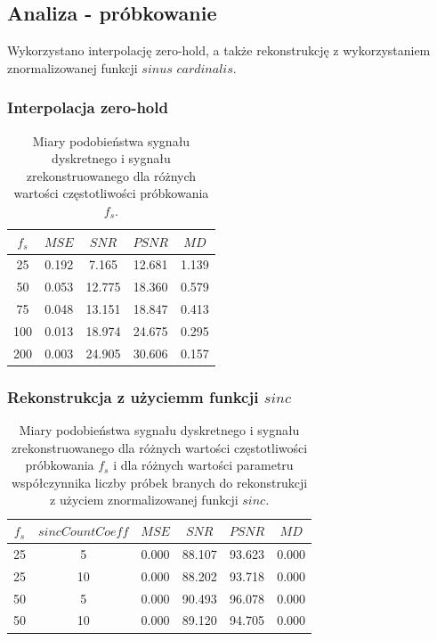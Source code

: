 \documentclass{article}
\begin{document}
\subsection{Analiza - próbkowanie}
Wykorzystano interpolację zero-hold, a także rekonstrukcję z wykorzystaniem znormalizowanej funkcji $sinus$ $cardinalis$.
\subsubsection{Interpolacja zero-hold}
\begin{table}[H]
\centering
\begin{tabular}{|c | c | c | c | c|}
 \hline
 $f_s$ & $MSE$ & $SNR$ & $PSNR$ & $MD$ \\
 \hline
 25 & 0.192 & 7.165 & 12.681 & 1.139 \\
 \hline
 50 & 0.053 & 12.775 & 18.360 & 0.579 \\
 \hline
 75 & 0.048 & 13.151 & 18.847 & 0.413 \\
 \hline
 100 & 0.013 & 18.974 & 24.675 & 0.295 \\
 \hline
 200 & 0.003 & 24.905 & 30.606 & 0.157 \\
 \hline
\end{tabular}
\caption{Miary podobieństwa sygnału dyskretnego i sygnału zrekonstruowanego dla różnych wartości częstotliwości próbkowania $f_s$.}
\label{table:zero_hold_sampling}
\end{table}

\subsubsection{Rekonstrukcja z użyciemm funkcji $sinc$}
\begin{table}[H]
\centering
\begin{tabular}{|c | c | c | c | c | c|}
 \hline
 $f_s$ & $sincCountCoeff$ & $MSE$ & $SNR$ & $PSNR$ & $MD$ \\
 \hline
 25 & 5 & 0.000 & 88.107 & 93.623 & 0.000 \\
 \hline
 25 & 10 & 0.000 & 88.202 & 93.718 & 0.000 \\
 \hline
 50 & 5 & 0.000 & 90.493 & 96.078 & 0.000 \\
 \hline
 50 & 10 & 0.000 & 89.120 & 94.705 & 0.000 \\
 \hline
\end{tabular}
\caption{Miary podobieństwa sygnału dyskretnego i sygnału zrekonstruowanego dla różnych wartości częstotliwości próbkowania $f_s$ i dla różnych wartości parametru współczynnika liczby próbek branych do rekonstrukcji z użyciem znormalizowanej funkcji $sinc$.}
\label{table:sinc_sampling}
\end{table}
\end{document}
